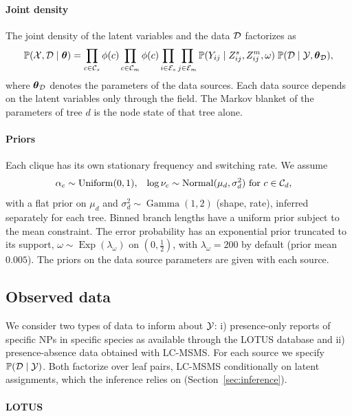 \documentclass[
11pt, %
oneside, %
english, %
singlespacing, %
headsepline, %
chapterinoneline, %
]{MastersDoctoralThesis} %
\DeclareMathOperator{\Unif}{Uniform}
\DeclareMathOperator{\Normal}{Normal}
\DeclareMathOperator{\GammaDist}{Gamma}
\DeclareMathOperator{\Exponential}{Exp}
\def\P{\mathbb{P}}
\def\btheta{\boldsymbol{\theta}}
\def\C{{\cal C}}
\def\E{{\cal E}}
\def\X{{\cal X}}
\def\Y{{\cal Y}}
\def\D{{\cal D}}
\begin{document}
\paragraph{Joint density} The joint density of the latent variables and the data $\D$ factorizes as
\begin{equation}
	\label{eq:joint}
	\P(\X, \D \mid \btheta) = \prod_{c \in \C_s} \phi(c) \prod_{c \in \C_m} \phi(c) \prod_{i \in \E_s} \prod_{j \in \E_m} \P(Y_{ij} \mid Z^s_{ij}, Z^m_{ij}, \omega)\; \P(\D \mid \Y, \btheta_\D),
\end{equation}
where $\btheta_\D$ denotes the parameters of the data sources. Each data source depends on the latent variables only through the field. The Markov blanket of the parameters of tree $d$ is the node state of that tree alone.

\paragraph{Priors} Each clique has its own stationary frequency and switching rate. We assume
\begin{align*}
	\alpha_c &\sim \Unif(0,1), &
	\log \nu_c &\sim \Normal(\mu_d, \sigma^2_d) \text{ for } c \in \C_d,
\end{align*}
with a flat prior on $\mu_d$ and $\sigma^2_d \sim \GammaDist(1, 2)$ (shape, rate), inferred separately for each tree. Binned branch lengths have a uniform prior subject to the mean constraint. The error probability has an exponential prior truncated to its support, $\omega \sim \Exponential(\lambda_\omega)$ on $(0,\tfrac12)$, with $\lambda_\omega = 200$ by default (prior mean $0.005$). The priors on the data source parameters are given with each source.

\subsection{Observed data}

We consider two types of data to inform about $\Y$: i) presence-only reports of specific NPs in specific species as available through the LOTUS database \cite{rutz_2022a} and ii) presence-absence data obtained with LC-MSMS. For each source we specify $\P(\D \mid \Y)$. Both factorize over leaf pairs, LC-MSMS conditionally on latent assignments, which the inference relies on (Section~\ref{sec:inference}).

\paragraph{LOTUS}
\end{document}
